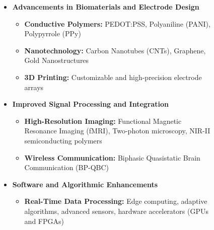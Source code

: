 \documentclass[twocolumn,10pt]{article}
\begin{document}
\begin{figure}[ht!]
      \begin{tcolorbox}[
                  title=Technological Advances in Visual Cortical Prostheses,
                  colframe=gray!30, %
                  colback=gray!20, %
                  coltitle=white, %
                  colbacktitle=gray!50, %
                  fonttitle=\bfseries,
                  sharp corners=all,
                  width=\textwidth,
                  boxrule=1.5pt %
            ]
            \fontsize{8pt}{10pt}\selectfont %
            \begin{itemize}
                  \item \textbf{Advancements in Biomaterials and Electrode Design}
                        \begin{itemize}
                              \item \textbf{Conductive Polymers:} PEDOT:PSS, Polyaniline (PANI), Polypyrrole (PPy)
                              \item \textbf{Nanotechnology:} Carbon Nanotubes (CNTs), Graphene, Gold Nanostructures
                              \item \textbf{3D Printing:} Customizable and high-precision electrode arrays
                        \end{itemize}

                  \item \textbf{Improved Signal Processing and Integration}
                        \begin{itemize}
                              \item \textbf{High-Resolution Imaging:} Functional Magnetic Resonance Imaging (fMRI), Two-photon microscopy, NIR-II semiconducting polymers
                              \item \textbf{Wireless Communication:} Biphasic Quasistatic Brain Communication (BP-QBC)
                        \end{itemize}

                  \item \textbf{Software and Algorithmic Enhancements}
                        \begin{itemize}
                              \item \textbf{Real-Time Data Processing:} Edge computing, adaptive algorithms, advanced sensors, hardware accelerators (GPUs and FPGAs)
                        \end{itemize}


\end{itemize}
\end{tcolorbox}
\end{figure}
\end{document}
